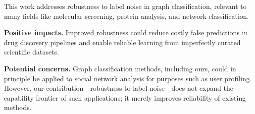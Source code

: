 \documentclass{article}
\theoremstyle{plain}
\theoremstyle{definition}
\theoremstyle{remark}
\begin{document}
This work addresses robustness to label noise in graph classification, relevant to many fields like molecular screening, protein analysis, and network classification. 

\textbf{Positive impacts.} Improved robustness could reduce costly false predictions in drug discovery pipelines and enable reliable learning from imperfectly curated scientific datasets.

\textbf{Potential concerns.} Graph classification methods, including ours, could in principle be applied to social network analysis for purposes such as user profiling. However, our contribution—robustness to label noise—does not expand the capability frontier of such applications; it merely improves reliability of existing methods.





\nocite{langley00}




\newpage
\appendix



\end{document}
